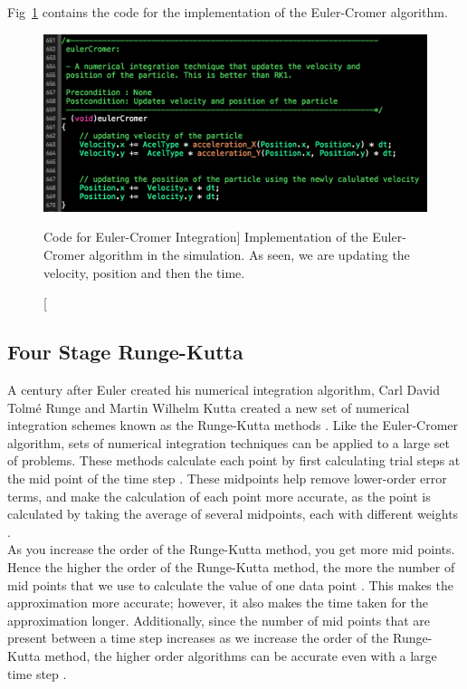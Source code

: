 \documentclass[12pt]{article} %
\begin{document}
Fig~\ref{fig:eulerCromer} contains the code for the implementation of the Euler-Cromer algorithm. 


\begin{figure}[H]
	\begin{center}
		\includegraphics[width=0.7\linewidth]{eulerCromer}
		\caption
		[Code for Euler-Cromer Integration]
		{Implementation of the Euler-Cromer algorithm in the simulation. As seen, we are updating the velocity, position and then the time.}
		\label{fig:eulerCromer}
	\end{center}
\end{figure}







\subsection{Four Stage Runge-Kutta} \label{NumericalInt:RK4}



 A century after Euler created his numerical integration algorithm, Carl David Tolmé Runge and Martin Wilhelm Kutta created a new set of numerical integration schemes known as the Runge-Kutta methods \cite{comparingODE}. Like the Euler-Cromer algorithm, sets of numerical integration techniques can be applied to a large set of problems. These methods calculate each point by first calculating trial steps at the mid point of the time step \cite{OldRunge}. These midpoints help remove lower-order error terms, and make the calculation of each point more accurate, as the point is calculated by taking the average of several midpoints, each with different weights \cite{OldRunge}.\\
 
 As you increase the order of the Runge-Kutta method, you get more mid points. Hence the higher the order of the Runge-Kutta method, the more the number of mid points that we use to calculate the value of one data point \cite{OldRunge}. This makes the approximation more accurate; however, it also makes the time taken for the approximation longer. Additionally, since the number of mid points that are present between a time step increases as we increase the order of the Runge-Kutta method, the higher order algorithms can be accurate even with a large time step \cite{OldRunge}. \\
 
\end{document}

